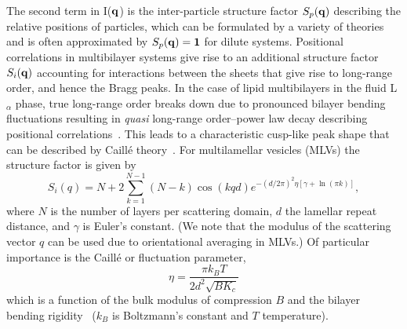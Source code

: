 \documentclass[8.5pt,twoside,twocolumn]{article}
\begin{document}
The second term in I($\bf{q}$) is the inter-particle structure factor $S_p(\bf{q})$ describing the relative positions of particles, which can be formulated by a variety of theories~\cite{Klein.2002} and is often approximated by $S_p(\bf{q}) = 1$ for dilute systems. Positional correlations in multibilayer systems give rise to an additional structure factor $S_i(\bf{q})$ accounting for interactions between the sheets that give rise to long-range order, and hence the Bragg peaks. In the case of lipid multibilayers in the fluid L$_\alpha$ phase, true long-range order breaks down due to pronounced bilayer bending fluctuations resulting in \textit{quasi} long-range order--power law decay describing positional correlations~\cite{Jeu.2003}. This leads to a characteristic cusp-like peak shape that can be described by Caill\'{e} theory~\cite{Caille.1972,Zhang.1994}. For multilamellar vesicles (MLVs) the structure factor is given by~\cite{Pabst.2000}
%
\begin{equation}
\label{eq:caille}
	S_i(q)=N+2\sum_{k=1}^{N-1} (N-k) \cos(k q d) e^{-(d/2\pi)^2 \eta \left[\gamma + \ln (\pi k)\right]},
\end{equation}
%
where $N$ is the number of layers per scattering domain, $d$ the lamellar repeat distance, and $\gamma$ is Euler's constant. (We note that the modulus of the scattering vector $q$ can be used due to orientational averaging in MLVs.) Of particular importance is the Caill\'{e} or fluctuation parameter,
%
\begin{equation}
\label{eq:eta}
	\eta = \frac{\pi k_B T}{2 d^2 \sqrt{B K_c}}
\end{equation}
which is a function of the bulk modulus of compression $B$ and the bilayer bending rigidity~\cite{Zhang.1994} ($k_B$ is Boltzmann's constant and $T$ temperature).
\end{document}
